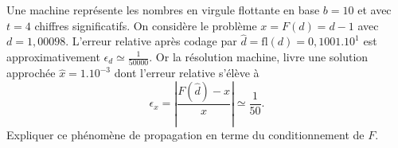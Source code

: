 
\begin{exercice}\label{exoSerieQuatre0005}

Une machine représente les nombres en virgule flottante en base $b=10$ et avec $t=4$ chiffres significatifs. On considère le problème $x=F(d)=d-1$ avec $d=1,00098$. L'erreur relative après codage par $\hat{d}=\mbox{fl}(d)=0,1001.10^1$ est approximativement $\epsilon_d\simeq\frac{1}{50000}$. Or la résolution machine, livre une solution approchée $\hat{x}=1.10^{-3}$ dont l'erreur relative s'élève à 
\begin{equation}
	\epsilon_x=\left|\frac{F(\hat{d})-x}{x}\right|\simeq\frac{1}{50}.
\end{equation}
Expliquer ce phénomène de propagation en terme du conditionnement de $F$.

\end{exercice}
